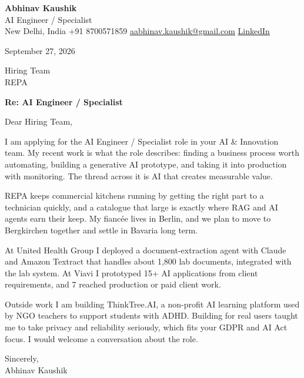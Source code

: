 \documentclass[11pt,a4paper]{article}
\begin{document}
{\Large\bfseries Abhinav Kaushik}\\
AI Engineer / Specialist\\
New Delhi, India \textbar{} +91 8700571859 \textbar{} \href{mailto:aabhinav.kaushik@gmail.com}{aabhinav.kaushik@gmail.com} \textbar{} \href{https://www.linkedin.com/in/abhinav-kaushik10/}{LinkedIn}  

September 27, 2026

Hiring Team\\
REPA

\textbf{Re: AI Engineer / Specialist}

Dear Hiring Team,

I am applying for the AI Engineer / Specialist role in your AI \& Innovation team. My recent work is what the role describes: finding a business process worth automating, building a generative AI prototype, and taking it into production with monitoring. The thread across it is AI that creates measurable value.

REPA keeps commercial kitchens running by getting the right part to a technician quickly, and a catalogue that large is exactly where RAG and AI agents earn their keep. My fiancée lives in Berlin, and we plan to move to Bergkirchen together and settle in Bavaria long term.

At United Health Group I deployed a document-extraction agent with Claude and Amazon Textract that handles about 1,800 lab documents, integrated with the lab system. At Viavi I prototyped 15+ AI applications from client requirements, and 7 reached production or paid client work.

Outside work I am building ThinkTree.AI, a non-profit AI learning platform used by NGO teachers to support students with ADHD. Building for real users taught me to take privacy and reliability seriously, which fits your GDPR and AI Act focus. I would welcome a conversation about the role.

Sincerely,\\[4pt]
Abhinav Kaushik
\end{document}
